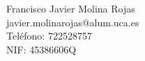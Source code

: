 Francisco Javier Molina Rojas \\ %
javier.molinarojas@alum.uca.es \\ %
Teléfono: 722528757 \\ %
NIF: 45386606Q \\ %
